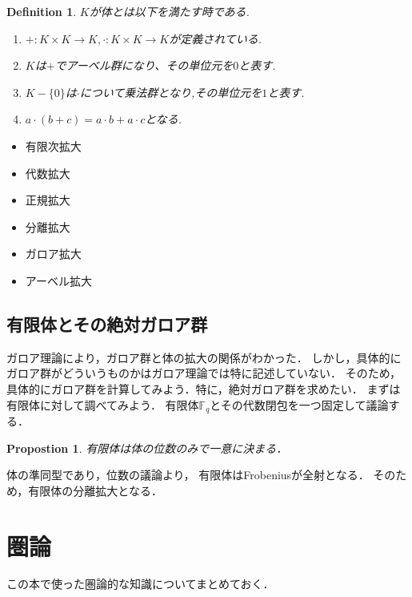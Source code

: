 \documentclass{ujarticle}
\newtheorem{dfn}[thm]{Definition}
\newtheorem{prop}[thm]{Propostion}
\begin{document}
\begin{dfn}
$K$が体とは以下を満たす時である.
\begin{enumerate}
  \setlength{\parskip}{0cm} %
  \setlength{\itemsep}{0cm} %
  \item $ + :K \times K \to K, \cdot : K \times K \to K$が定義されている.
  \item $K$は$+$でアーベル群になり、その単位元を$0$と表す.
  \item $K - \{ 0 \}$は$  \cdot   $について乗法群となり,その単位元を$1$と表す.
  \item $a \cdot (b + c) = a \cdot b + a \cdot c $となる.
\end{enumerate}
\end{dfn}













\begin{itemize}
  \item 有限次拡大
  \item 代数拡大
  \item 正規拡大
  \item 分離拡大
  \item ガロア拡大
  \item アーベル拡大
\end{itemize}

\subsection{有限体とその絶対ガロア群}
\label{sub:有限体とその絶対ガロア群}
ガロア理論により，ガロア群と体の拡大の関係がわかった．
しかし，具体的にガロア群がどういうものかはガロア理論では特に記述していない．
そのため，具体的にガロア群を計算してみよう．特に，絶対ガロア群を求めたい．
まずは有限体に対して調べてみよう．
有限体$\mathbb{F}_q$とその代数閉包を一つ固定して議論する．
\begin{prop}
  有限体は体の位数のみで一意に決まる．
\end{prop}

体の準同型であり，位数の議論より，
有限体はFrobeniusが全射となる．
そのため，有限体の分離拡大となる．

\appendix

\section{圏論}
この本で使った圏論的な知識についてまとめておく．
\end{document}
